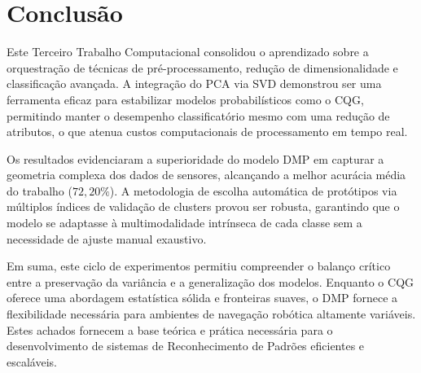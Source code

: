 \section{Conclusão}
\label{chap:conclusao}

Este Terceiro Trabalho Computacional consolidou o aprendizado sobre a orquestração de técnicas de pré-processamento, redução de dimensionalidade e classificação avançada. A integração do PCA via SVD demonstrou ser uma ferramenta eficaz para estabilizar modelos probabilísticos como o CQG, permitindo manter o desempenho classificatório mesmo com uma redução de atributos, o que atenua custos computacionais de processamento em tempo real.

Os resultados evidenciaram a superioridade do modelo DMP em capturar a geometria complexa dos dados de sensores, alcançando a melhor acurácia média do trabalho ($72,20\%$). A metodologia de escolha automática de protótipos via múltiplos índices de validação de clusters provou ser robusta, garantindo que o modelo se adaptasse à multimodalidade intrínseca de cada classe sem a necessidade de ajuste manual exaustivo.

Em suma, este ciclo de experimentos permitiu compreender o balanço crítico entre a preservação da variância e a generalização dos modelos. Enquanto o CQG oferece uma abordagem estatística sólida e fronteiras suaves, o DMP fornece a flexibilidade necessária para ambientes de navegação robótica altamente variáveis. Estes achados fornecem a base teórica e prática necessária para o desenvolvimento de sistemas de Reconhecimento de Padrões eficientes e escaláveis.
